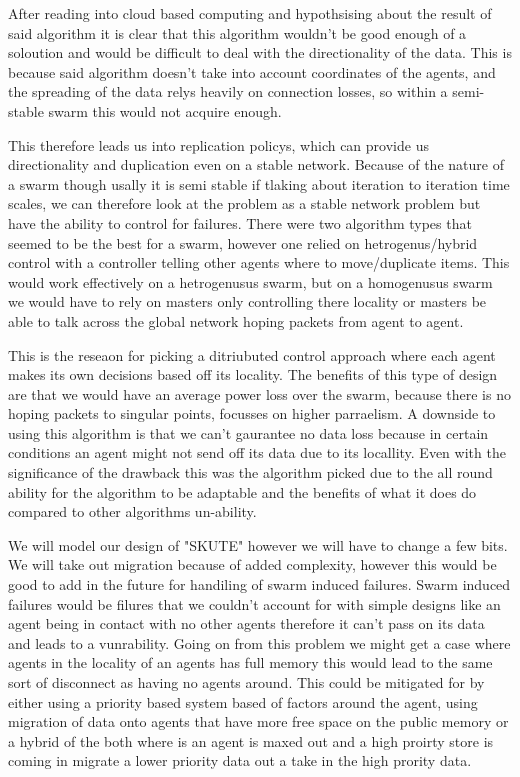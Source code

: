 \documentclass{UoYCSproject}
\begin{document}
After reading into cloud based computing and hypothsising about the result of said algorithm it is clear that this algorithm wouldn't be good enough of a soloution and would be difficult to deal with the directionality of the data.
This is because said algorithm doesn't take into account coordinates of the agents, and the spreading of the data relys heavily on connection losses, so within a semi-stable swarm this would not acquire enough.

This therefore leads us into replication policys, which can provide us directionality and duplication even on a stable network.
Because of the nature of a swarm though usally it is semi stable if tlaking about iteration to iteration time scales, we can therefore look at the problem as a stable network problem but have the ability to control for failures.
There were two algorithm types that seemed to be the best for a swarm, however one relied on hetrogenus/hybrid control with a controller telling other agents where to move/duplicate items.
This would work effectively on a hetrogenusus swarm, but on a homogenusus swarm we would have to rely on masters only controlling there locality or masters be able to talk across the global network hoping packets from agent to agent.

This is the reseaon for picking a ditriubuted control approach where each agent makes its own decisions based off its locality. 
The benefits of this type of design are that we would have an average power loss over the swarm, because there is no hoping packets to singular points, focusses on higher parraelism.
A downside to using this algorithm is that we can't gaurantee no data loss because in certain conditions an agent might not send off its data due to its locallity.
Even with the significance of the drawback this was the algorithm picked due to the all round ability for the algorithm to be adaptable and the benefits of what it does do compared to other algorithms un-ability.

We will model our design of "SKUTE" however we will have to change a few bits.
We will take out migration because of added complexity, however this would be good to add in the future for handiling of swarm induced failures.
Swarm induced failures would be filures that we couldn't account for with simple designs like an agent being in contact with no other agents therefore it can't pass on its data and leads to a vunrability.
Going on from this problem we might get a case where agents in the locality of an agents has full memory this would lead to the same sort of disconnect as having no agents around.
This could be mitigated for by either using a priority based system based of factors around the agent, using migration of data onto agents that have more free space on the public memory or a hybrid of the both where is an agent is maxed out and a high proirty store is coming in migrate a lower priority data out a take in the high prority data.
\end{document}
